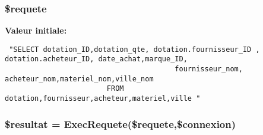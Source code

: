 \hypertarget{biotox__inventaire__resultats_8php_a2}{
\subsubsection[\$requete]{\setlength{\rightskip}{0pt plus 5cm}\$requete}}
\label{biotox__inventaire__resultats_8php_a2}


{\bf Valeur initiale:}

\footnotesize\begin{verbatim} "SELECT dotation_ID,dotation_qte, dotation.fournisseur_ID , dotation.acheteur_ID, date_achat,marque_ID,
                                        fournisseur_nom, acheteur_nom,materiel_nom,ville_nom
                        FROM dotation,fournisseur,acheteur,materiel,ville "
\end{verbatim}\normalsize 
\hypertarget{biotox__inventaire__resultats_8php_a3}{
\subsubsection[\$resultat]{\setlength{\rightskip}{0pt plus 5cm}\$resultat = Exec\-Requete(\$requete,\$connexion)}}
\label{biotox__inventaire__resultats_8php_a3}


